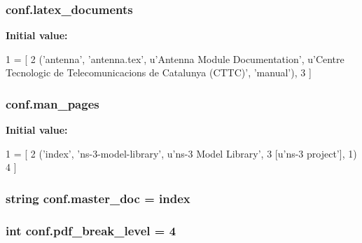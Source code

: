 \subsubsection[{\texorpdfstring{latex\+\_\+documents}{latex_documents}}]{ conf.\+latex\+\_\+documents}\hypertarget{namespaceconf_a00b7896473527f894006130b1113cb4b}{}\label{namespaceconf_a00b7896473527f894006130b1113cb4b}
{\bfseries Initial value\+:}
\begin{DoxyCode}
1 = [
2   (\textcolor{stringliteral}{'antenna'}, \textcolor{stringliteral}{'antenna.tex'}, \textcolor{stringliteral}{u'Antenna Module Documentation'}, \textcolor{stringliteral}{u'Centre Tecnologic de Telecomunicacions de
       Catalunya (CTTC)'}, \textcolor{stringliteral}{'manual'}),
3 ]
\end{DoxyCode}
\subsubsection[{\texorpdfstring{man\+\_\+pages}{man_pages}}]{ conf.\+man\+\_\+pages}\hypertarget{namespaceconf_a45cae4ca704c12a150b112eb1b66d0b1}{}\label{namespaceconf_a45cae4ca704c12a150b112eb1b66d0b1}
{\bfseries Initial value\+:}
\begin{DoxyCode}
1 = [
2     (\textcolor{stringliteral}{'index'}, \textcolor{stringliteral}{'ns-3-model-library'}, \textcolor{stringliteral}{u'ns-3 Model Library'},
3      [\textcolor{stringliteral}{u'ns-3 project'}], 1)
4 ]
\end{DoxyCode}
\subsubsection[{\texorpdfstring{master\+\_\+doc}{master_doc}}]{\setlength{\rightskip}{0pt plus 5cm}string conf.\+master\+\_\+doc = \textquotesingle{}index\textquotesingle{}}\hypertarget{namespaceconf_ae22a29d94a222730836db739d6dbd71e}{}\label{namespaceconf_ae22a29d94a222730836db739d6dbd71e}
\subsubsection[{\texorpdfstring{pdf\+\_\+break\+\_\+level}{pdf_break_level}}]{\setlength{\rightskip}{0pt plus 5cm}int conf.\+pdf\+\_\+break\+\_\+level = 4}\hypertarget{namespaceconf_a5f25cec5a72d1111f56f5a416be2a8d1}{}\label{namespaceconf_a5f25cec5a72d1111f56f5a416be2a8d1}
